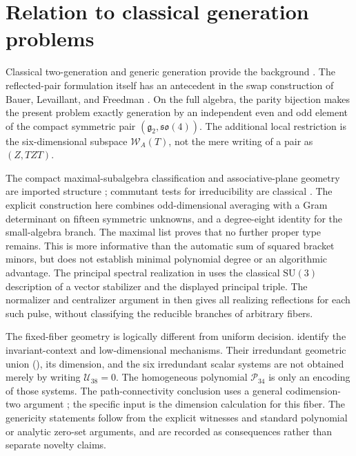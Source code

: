 \documentclass[11pt,a4paper]{article}
\newcommand{\SU}{\mathrm{SU}}
\begin{document}
\section{Relation to classical generation problems}
Classical two-generation and generic generation provide the background \cite{Kuranishi1951,AlbuquerqueSilvaLeite1989,Bois2009,DetinkoDeGraaf2020,Chirvasitu2021}.
The reflected-pair formulation itself has an antecedent in the swap construction of Bauer, Levaillant, and Freedman \cite{BauerLevaillantFreedman2014}.
On the full algebra, the parity bijection makes the present problem exactly generation by an independent even and odd element of the compact symmetric pair $(\mathfrak g_2,\mathfrak{so}(4))$.
The additional local restriction is the six-dimensional subspace $\mathcal W_A(T)$, not the mere writing of a pair as $(Z,TZT)$.

The compact maximal-subalgebra classification and associative-plane geometry are imported structure \cite{DraperMartin2025,Dynkin1952b,Cacciatori2005,KnarrStroppel2025}; commutant tests for irreducibility are classical \cite{ZeierSchulteHerbrueggen2011}.
The explicit construction here combines odd-dimensional averaging with a Gram determinant on fifteen symmetric unknowns, and a degree-eight identity for the small-algebra branch.
The maximal list proves that no further proper type remains.
This is more informative than the automatic sum of squared bracket minors, but does not establish minimal polynomial degree or an algorithmic advantage.
The principal spectral realization in  uses the classical $\SU(3)$ description of a vector stabilizer and the displayed principal triple.  The normalizer and centralizer argument in  then gives all realizing reflections for each such pulse, without classifying the reducible branches of arbitrary fibers.

The fixed-fiber geometry is logically different from uniform decision.
 identify the invariant-context and low-dimensional mechanisms.
Their irredundant geometric union (), its dimension, and the six irredundant scalar systems are not obtained merely by writing $\mathcal U_{38}=0$.
The homogeneous polynomial $\mathcal P_{34}$ is only an encoding of those systems.
The path-connectivity conclusion uses a general codimension-two argument \cite{BochnakCosteRoy1998}; the specific input is the dimension calculation for this fiber.
The genericity statements follow from the explicit witnesses and standard polynomial or analytic zero-set arguments, and are recorded as consequences rather than separate novelty claims.
\end{document}
